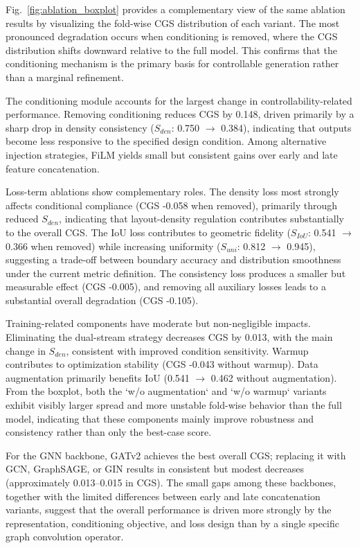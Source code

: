 Fig.~\ref{fig:ablation_boxplot} provides a complementary view of the same ablation results by visualizing the fold-wise CGS distribution of each variant. The most pronounced degradation occurs when conditioning is removed, where the CGS distribution shifts downward relative to the full model. This confirms that the conditioning mechanism is the primary basis for controllable generation rather than a marginal refinement.

The conditioning module accounts for the largest change in controllability-related performance. Removing conditioning reduces CGS by 0.148, driven primarily by a sharp drop in density consistency ($S_{den}$: 0.750 $\rightarrow$ 0.384), indicating that outputs become less responsive to the specified design condition. Among alternative injection strategies, FiLM yields small but consistent gains over early and late feature concatenation.

Loss-term ablations show complementary roles. The density loss most strongly affects conditional compliance (CGS -0.058 when removed), primarily through reduced $S_{den}$, indicating that layout-density regulation contributes substantially to the overall CGS. The IoU loss contributes to geometric fidelity ($S_{IoU}$: 0.541 $\rightarrow$ 0.366 when removed) while increasing uniformity ($S_{uni}$: 0.812 $\rightarrow$ 0.945), suggesting a trade-off between boundary accuracy and distribution smoothness under the current metric definition. The consistency loss produces a smaller but measurable effect (CGS -0.005), and removing all auxiliary losses leads to a substantial overall degradation (CGS -0.105).

Training-related components have moderate but non-negligible impacts. Eliminating the dual-stream strategy decreases CGS by 0.013, with the main change in $S_{den}$, consistent with improved condition sensitivity. Warmup contributes to optimization stability (CGS -0.043 without warmup). Data augmentation primarily benefits IoU (0.541 $\rightarrow$ 0.462 without augmentation). From the boxplot, both the `w/o augmentation` and `w/o warmup` variants exhibit visibly larger spread and more unstable fold-wise behavior than the full model, indicating that these components mainly improve robustness and consistency rather than only the best-case score.

For the GNN backbone, GATv2 achieves the best overall CGS; replacing it with GCN, GraphSAGE, or GIN results in consistent but modest decreases (approximately 0.013--0.015 in CGS). The small gaps among these backbones, together with the limited differences between early and late concatenation variants, suggest that the overall performance is driven more strongly by the representation, conditioning objective, and loss design than by a single specific graph convolution operator.

